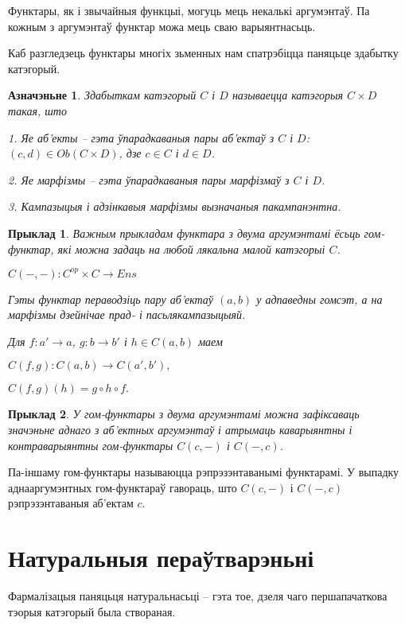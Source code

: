 \documentclass[a4paper,12pt]{book}
\newtheorem{example}{Прыклад}[section]
\newtheorem{definition}{Азначэньне}[section]
\begin{document}
Функтары, як і звычайныя функцыі, могуць мець некалькі аргумэнтаў. Па
кожным з аргумэнтаў функтар можа мець сваю варыянтнасьць.

Каб разгледзець функтары многіх зьменных нам спатрэбіцца паняцьце
здабытку катэгорый.

\begin{definition}
  Здабыткам катэгорый $C$ і $D$ называецца катэгорыя $C \times D$
  такая, што

  1. Яе аб'екты -- гэта ўпарадкаваныя пары аб'ектаў з $C$ і $D$: $(c,
  d) \in Ob(C \times D)$, дзе $c \in C$ і $d \in D$.

  2. Яе марфізмы -- гэта ўпарадкаваныя пары марфізмаў з $C$ і $D$.

  3. Кампазыцыя і адзінкавыя марфізмы вызначаныя пакампанэнтна.
\end{definition}

\begin{example}
  Важным прыкладам функтара з двума аргумэнтамі ёсьць гом-функтар, які
  можна задаць на любой лякальна малой катэгорыі $C$.

  $C(-, -): C^{op} \times C \rightarrow Ens$

  Гэты функтар пераводзіць пару аб'ектаў $(a, b)$ у адпаведны гомсэт,
  а на марфізмы дзейнічае прад- і пасьлякампазыцыяй.

  Для $f: a' \rightarrow a$, $g: b \rightarrow b'$ і $h \in C(a, b)$
  маем

  $C(f, g): C(a, b) \rightarrow C(a', b'),$

  $C(f, g)(h) = g \circ h \circ f.$
\end{example}

\begin{example}
  У гом-функтары з двума аргумэнтамі можна зафіксаваць значэньне аднаго
  з аб'ектных аргумэнтаў і атрымаць каварыянтны і контраварыянтны
  гом-функтары $C(c, -)$ і $C(-, c)$.
\end{example}

Па-іншаму гом-функтары называюцца рэпрэзэнтаванымі функтарамі. У
выпадку аднааргумэнтных гом-функтараў гавораць, што $C(c, -)$ і $C(-,
c)$ рэпрэзэнтаваныя аб'ектам $c$.

\section{Натуральныя пераўтварэньні}

Фармалізацыя паняцьця натуральнасьці -- гэта тое, дзеля чаго
першапачаткова тэорыя катэгорый была створаная.
\end{document}
